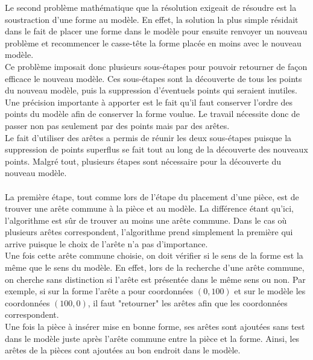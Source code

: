 \documentclass[a4paper, 11pt]{report}
\begin{document}
		Le second problème mathématique que la résolution exigeait de résoudre est la soustraction d'une forme au modèle. En effet, la solution la plus simple résidait dans le fait de placer une forme dans le modèle pour ensuite renvoyer un nouveau problème et recommencer le casse-t\^ete la forme placée en moins avec le nouveau modèle.\\
		Ce problème imposait donc plusieurs sous-étapes pour pouvoir retourner de façon efficace le nouveau modèle. Ces sous-étapes sont la découverte de tous les points du nouveau modèle, puis la suppression d'éventuels points qui seraient inutiles. Une précision importante à apporter est le fait qu'il faut conserver l'ordre des points du modèle afin de conserver la forme voulue. Le travail nécessite donc de passer non pas seulement par des points mais par des arêtes.\\
		Le fait d'utiliser des arêtes a permis de réunir les deux sous-étapes puisque la suppression de points superflus se fait tout au long de la découverte des nouveaux points. Malgré tout, plusieurs étapes sont nécessaire pour la découverte du nouveau modèle.\\ \ \\
		La première étape, tout comme lors de l'étape du placement d'une pièce, est de trouver une arête commune à la pièce et au modèle. La différence étant qu'ici, l'algorithme est sûr de trouver au moins une arête commune. Dans le cas où plusieurs arêtes correspondent, l'algorithme prend simplement la première qui arrive puisque le choix de l'arête n'a pas d'importance.\\
		Une fois cette arête commune choisie, on doit vérifier si le sens de la forme est la même que le sens du modèle. En effet, lors de la recherche d'une arête commune, on cherche sans distinction si l'arête est présentée dans le même sens ou non. Par exemple, si sur la forme l'arête a pour coordonnées $(0,100)$ et sur le modèle les coordonnées $(100,0)$, il faut "retourner" les arêtes afin que les coordonnées correspondent.\\
		Une fois la pièce à insérer mise en bonne forme, ses arêtes sont ajoutées sans test dans le modèle juste après l'arête commune entre la pièce et la forme. Ainsi, les arêtes de la pièces cont ajoutées au bon endroit dans le modèle.\\
		
\end{document}
